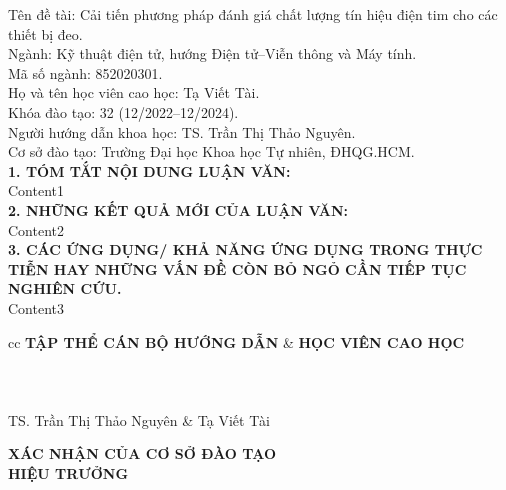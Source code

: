 \begin{flushleft}
	Tên đề tài: Cải tiến phương pháp đánh giá chất lượng tín hiệu điện tim cho các thiết bị đeo. \\
	Ngành: Kỹ thuật điện tử, hướng Điện tử--Viễn thông và Máy tính. \\
	Mã số ngành: 852020301. \\
	Họ và tên học viên cao học: Tạ Viết Tài. \\
	Khóa đào tạo: 32 (12/2022--12/2024). \\
	Người hướng dẫn khoa học: TS. Trần Thị Thảo Nguyên.\\
	Cơ sở đào tạo: Trường Đại học Khoa học Tự nhiên, ĐHQG.HCM. \\
	\vspace{1.5em}
	\textbf{1. TÓM TẮT NỘI DUNG LUẬN VĂN:}\\
	Content1 \\
	\textbf{2. NHỮNG KẾT QUẢ MỚI CỦA LUẬN VĂN:}\\
	Content2 \\
	\textbf{3. CÁC ỨNG DỤNG/ KHẢ NĂNG ỨNG DỤNG TRONG THỰC TIỄN HAY NHỮNG VẤN ĐỀ CÒN BỎ NGỎ CẦN TIẾP TỤC NGHIÊN CỨU.}\\
	Content3 \\
\end{flushleft}


\vspace{1.5em}
\begin{tblr}{cc}
	\centering
	\textbf{TẬP THỂ CÁN BỘ HƯỚNG DẪN} & \textbf{\hspace{5.0em}HỌC VIÊN CAO HỌC} \\
	\\
	\\
	\\
	TS. Trần Thị Thảo Nguyên          & \hspace{5.0em} Tạ Viết Tài
\end{tblr}

\vspace{2.5em}
\begin{center}
	\textbf{XÁC NHẬN CỦA CƠ SỞ ĐÀO TẠO} \\
	\textbf{HIỆU TRƯỞNG}
\end{center}